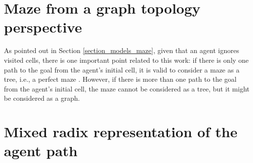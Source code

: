 \section{Maze from a graph topology perspective}
\label{section_models_maze_graph}
As pointed out in Section \ref{section_models_maze}, given that an agent ignores visited cells, there is one important point related to this work: if there is only one path to the goal from the agent's initial cell, it is valid to consider a maze as a tree, i.e., a perfect maze \cite{Muhammad2021}. However, if there is more than one path to the goal from the agent's initial cell, the maze cannot be considered as a tree, but it might be considered as a graph.

\section{Mixed radix representation of the agent path}
\label{section_models_mixed_radix}